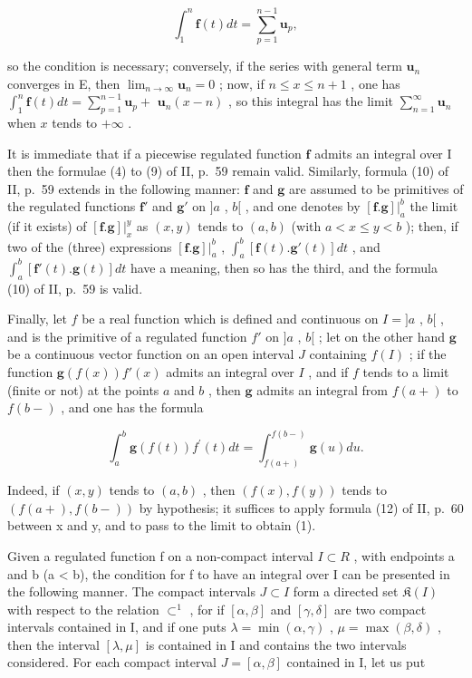 \[
\int_ {1} ^ {n} \mathbf {f} (t) d t = \sum_ {p = 1} ^ {n - 1} \mathbf {u} _ {p},
\]

so the condition is necessary; conversely, if the series with general term \(\mathbf{u}_n\) converges in E, then \(\lim_{n\to \infty}\mathbf{u}_n = 0\) ; now, if \(n\leqslant x\leqslant n + 1\) , one has \(\int_1^n\mathbf{f}(t)dt = \sum_{p = 1}^{n - 1}\mathbf{u}_p +\) \(\mathbf{u}_n(x - n)\) , so this integral has the limit \(\sum_{n = 1}^{\infty}\mathbf{u}_n\) when \(x\) tends to \(+\infty\) .

It is immediate that if a piecewise regulated function \(\mathbf{f}\) admits an integral over I then the formulae (4) to (9) of II, p.~59 remain valid. Similarly, formula (10) of II, p.~59 extends in the following manner: \(\mathbf{f}\) and \(\mathbf{g}\) are assumed to be primitives of the regulated functions \(\mathbf{f}'\) and \(\mathbf{g}'\) on \(]a\) , \(b[\) , and one denotes by \([\mathbf{f}.\mathbf{g}]|_a^b\) the limit (if it exists) of \([\mathbf{f}.\mathbf{g}]|_x^y\) as \((x, y)\) tends to \((a, b)\) (with \(a < x \leqslant y < b\) ); then, if two of the (three) expressions \([\mathbf{f}.\mathbf{g}]|_a^b\) , \(\int_a^b [\mathbf{f}(t).\mathbf{g}'(t)] dt\) , and \(\int_a^b [\mathbf{f}'(t).\mathbf{g}(t)] dt\) have a meaning, then so has the third, and the formula (10) of II, p.~59 is valid.

Finally, let \(f\) be a real function which is defined and continuous on \(I = ]a\) , \(b[\) , and is the primitive of a regulated function \(f'\) on \(]a\) , \(b[\) ; let on the other hand \(\mathbf{g}\) be a continuous vector function on an open interval \(J\) containing \(f(I)\) ; if the function \(\mathbf{g}(f(x))f'(x)\) admits an integral over \(I\) , and if \(f\) tends to a limit (finite or not) at the points \(a\) and \(b\) , then \(\mathbf{g}\) admits an integral from \(f(a+)\) to \(f(b-)\) , and one has the formula

\[
\int_ {a} ^ {b} \mathbf {g} (f (t)) f ^ {\prime} (t) d t = \int_ {f (a +)} ^ {f (b -)} \mathbf {g} (u) d u.\tag{1}
\]

Indeed, if \((x, y)\) tends to \((a, b)\) , then \((f(x), f(y))\) tends to \((f(a+), f(b-))\) by hypothesis; it suffices to apply formula (12) of II, p.~60 between x and y, and to pass to the limit to obtain (1).

Given a regulated function f on a non-compact interval \(I \subset R\) , with endpoints a and b (a \textless{} b), the condition for f to have an integral over I can be presented in the following manner. The compact intervals \(J \subset I\) form a directed set \(\mathfrak{K}(I)\) with respect to the relation \(\subset^{1}\) , for if \([\alpha, \beta]\) and \([\gamma, \delta]\) are two compact intervals contained in I, and if one puts \(\lambda = \min(\alpha, \gamma)\) , \(\mu = \max(\beta, \delta)\) , then the interval \([\lambda, \mu]\) is contained in I and contains the two intervals considered. For each compact interval \(J = [\alpha, \beta]\) contained in I, let us put


